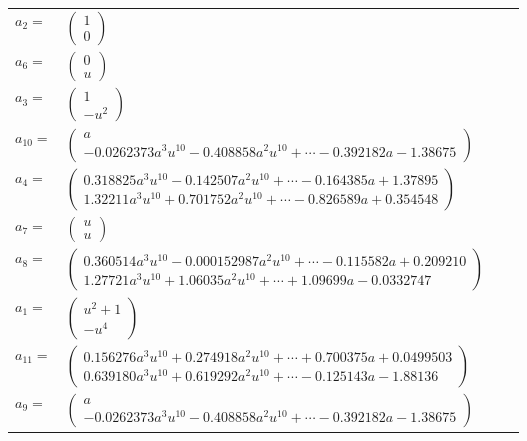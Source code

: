 \documentclass[1p]{elsarticle_modified}
\theoremstyle{definition}
\begin{document}
\begin{tabular}{m{7pt} m{180pt} m{7pt} m{180pt} }
\flushright $a_{2}=$&$\begin{pmatrix}1\\0\end{pmatrix}$ \\
\flushright $a_{6}=$&$\begin{pmatrix}0\\u\end{pmatrix}$ \\
\flushright $a_{3}=$&$\begin{pmatrix}1\\- u^2\end{pmatrix}$ \\
\flushright $a_{10}=$&$\begin{pmatrix}a\\-0.0262373 a^{3} u^{10}-0.408858 a^{2} u^{10}+\cdots-0.392182 a-1.38675\end{pmatrix}$ \\
\flushright $a_{4}=$&$\begin{pmatrix}0.318825 a^{3} u^{10}-0.142507 a^{2} u^{10}+\cdots-0.164385 a+1.37895\\1.32211 a^{3} u^{10}+0.701752 a^{2} u^{10}+\cdots-0.826589 a+0.354548\end{pmatrix}$ \\
\flushright $a_{7}=$&$\begin{pmatrix}u\\u\end{pmatrix}$ \\
\flushright $a_{8}=$&$\begin{pmatrix}0.360514 a^{3} u^{10}-0.000152987 a^{2} u^{10}+\cdots-0.115582 a+0.209210\\1.27721 a^{3} u^{10}+1.06035 a^{2} u^{10}+\cdots+1.09699 a-0.0332747\end{pmatrix}$ \\
\flushright $a_{1}=$&$\begin{pmatrix}u^2+1\\- u^4\end{pmatrix}$ \\
\flushright $a_{11}=$&$\begin{pmatrix}0.156276 a^{3} u^{10}+0.274918 a^{2} u^{10}+\cdots+0.700375 a+0.0499503\\0.639180 a^{3} u^{10}+0.619292 a^{2} u^{10}+\cdots-0.125143 a-1.88136\end{pmatrix}$ \\
\flushright $a_{9}=$&$\begin{pmatrix}a\\-0.0262373 a^{3} u^{10}-0.408858 a^{2} u^{10}+\cdots-0.392182 a-1.38675\end{pmatrix}$ \\

\end{tabular}
\end{document}
